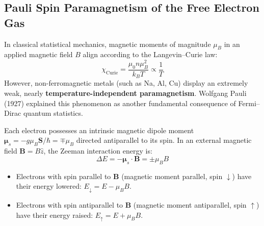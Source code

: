 \documentclass[11pt,a4paper]{article}
\newcommand{\vb}[1]{\mathbf{#1}}
\begin{document}
\subsection{Pauli Spin Paramagnetism of the Free Electron Gas}
In classical statistical mechanics, magnetic moments of magnitude $\mu_B$ in an applied magnetic field $B$ align according to the Langevin--Curie law:
\begin{equation}
\chi_{\mathrm{Curie}} = \frac{\mu_0 n \mu_B^2}{k_B T} \propto \frac{1}{T}
\end{equation}
However, non-ferromagnetic metals (such as Na, Al, Cu) display an extremely weak, nearly \textbf{temperature-independent paramagnetism}. Wolfgang Pauli (1927) explained this phenomenon as another fundamental consequence of Fermi--Dirac quantum statistics.

Each electron possesses an intrinsic magnetic dipole moment $\bm{\mu}_s = -g \mu_B \vb{S}/\hbar = \mp \mu_B$ directed antiparallel to its spin. In an external magnetic field $\vb{B} = B\hat{z}$, the Zeeman interaction energy is:
\begin{equation}
\Delta E = -\bm{\mu}_s \cdot \vb{B} = \pm \mu_B B
\end{equation}
\begin{itemize}
    \item Electrons with spin parallel to $\vb{B}$ (magnetic moment parallel, spin $\downarrow$) have their energy lowered: $E_\downarrow = E - \mu_B B$.
    \item Electrons with spin antiparallel to $\vb{B}$ (magnetic moment antiparallel, spin $\uparrow$) have their energy raised: $E_\uparrow = E + \mu_B B$.
\end{itemize}
\end{document}
